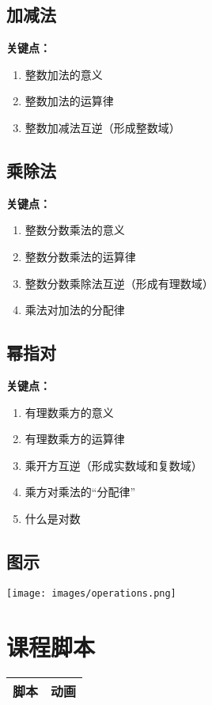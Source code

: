 \documentclass{article}
\begin{document}
\begin{CJK*}{UTF8}{gbsn}
\subsection{加减法}
\textbf{关键点：}
\begin{enumerate}
    \item 整数加法的意义
    \item 整数加法的运算律
    \item 整数加减法互逆（形成整数域）
\end{enumerate}


\subsection{乘除法}
\textbf{关键点：}
\begin{enumerate}
    \item 整数分数乘法的意义
    \item 整数分数乘法的运算律
    \item 整数分数乘除法互逆（形成有理数域）
    \item 乘法对加法的分配律
\end{enumerate}


\subsection{幂指对}
\textbf{关键点：}
\begin{enumerate}
    \item 有理数乘方的意义
    \item 有理数乘方的运算律
    \item 乘开方互逆（形成实数域和复数域）
    \item 乘方对乘法的“分配律”
    \item 什么是对数
\end{enumerate}


\subsection{图示}
\texttt{[image: images/operations.png]}


\newpage

\section{课程脚本}
\begin{tabularx}{0.99\textwidth}{ 
  | >{\centering\arraybackslash}X 
  | >{\centering\arraybackslash}X | }
 \hline
 \textbf{脚本}  & \textbf{动画} \\
 \hline
\end{tabularx}



\end{CJK*}
\end{document}
